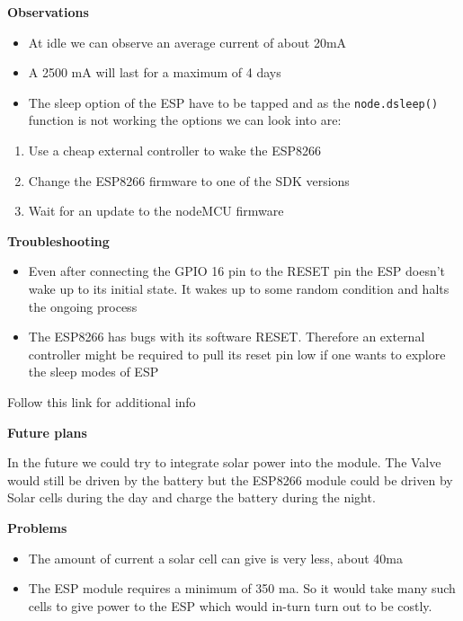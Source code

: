 \documentclass[16pt]{article}
\begin{document}
{\Large{\textbf{Observations}}}

\begin{itemize}

\item
  At idle we can observe an average current of about 20mA
\item
  A 2500 mA will last for a maximum of 4 days
\item
  The sleep option of the ESP have to be tapped and as the
  \texttt{node.dsleep()} function is not working the options we can look
  into are:
\end{itemize}

\begin{enumerate}

\item
  Use a cheap external controller to wake the ESP8266
\item
  Change the ESP8266 firmware to one of the SDK versions
\item
  Wait for an update to the nodeMCU firmware
\end{enumerate}

\textbf{Troubleshooting}

\begin{itemize}
\item
  Even after connecting the GPIO 16 pin to the RESET pin the ESP doesn't
  wake up to its initial state. It wakes up to some random condition and
  halts the ongoing process
\item
  The ESP8266 has bugs with its software RESET. Therefore an external
  controller might be required to pull its reset pin low if one wants to
  explore the sleep modes of ESP
\end{itemize}

Follow this link for additional info

{\Large{\textbf{Future plans}}}

In the future we could try to integrate solar power into the module. The
Valve would still be driven by the battery but the ESP8266 module could
be driven by Solar cells during the day and charge the battery during
the night.

\textbf{Problems}

\begin{itemize}

\item
  The amount of current a solar cell can give is very less, about 40ma
\item
  The ESP module requires a minimum of 350 ma. So it would take many
  such cells to give power to the ESP which would in-turn turn out to be
  costly.
\end{itemize}
\end{document}
